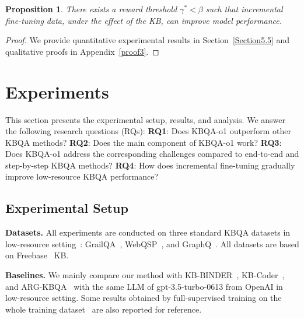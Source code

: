 \documentclass{article}
\theoremstyle{plain}
\newtheorem{proposition}[theorem]{Proposition}
\theoremstyle{definition}
\theoremstyle{remark}
\begin{document}
\begin{proposition}
There exists a reward threshold $\gamma^*<\beta$ such that incremental fine-tuning data, under the effect of the KB, can improve model performance.
\end{proposition}
\begin{proof} 
We provide quantitative experimental results in Section~\ref{Section5.5} and qualitative proofs in Appendix~\ref{proof3}.
\end{proof}


\section{Experiments}
This section presents the experimental setup, results, and analysis. We answer the following research questions (RQs):
\textbf{RQ1}: Does KBQA-o1 outperform other KBQA methods?
\textbf{RQ2}: Does the main component of KBQA-o1 work?
\textbf{RQ3}: Does KBQA-o1 address the corresponding challenges compared to end-to-end and step-by-step KBQA methods?
\textbf{RQ4}: How does incremental fine-tuning gradually improve low-resource KBQA performance?


\subsection{Experimental Setup}

\textbf{Datasets. } All experiments are conducted on three standard KBQA datasets in low-resource setting~\cite{KB-BINDER}: GrailQA~\cite{GrailQA}, WebQSP~\cite{WebQSP}, and GraphQ~\citep{GraphQ}. All datasets are based on Freebase~\citep{Freebase} KB. 

\textbf{Baselines. } We mainly compare our method with KB-BINDER~\cite{KB-BINDER}, KB-Coder~\cite{KB-Coder}, and ARG-KBQA~\cite{ARG-KBQA} with the same LLM of gpt-3.5-turbo-0613 from OpenAI in low-resource setting. Some results obtained by full-supervised training on the whole training dataset~\cite{RnG-KBQA,DecAF,TIARA,SPARQA,GrailQA,ArcaneQA} are also reported for reference.
\end{document}
